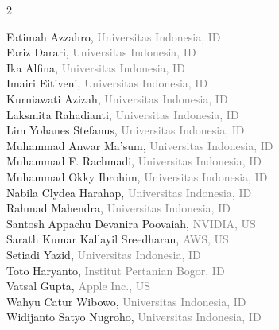 \documentclass[10pt,a4paper]{article}
\begin{document}
\begin{multicols}{2}
\begin{minipage}{\linewidth}
Fatimah Azzahro, \textcolor{gray}{Universitas Indonesia, ID}\\
Fariz Darari, \textcolor{gray}{Universitas Indonesia, ID}\\
Ika Alfina, \textcolor{gray}{Universitas Indonesia, ID}\\
Imairi Eitiveni, \textcolor{gray}{Universitas Indonesia, ID}\\
Kurniawati Azizah, \textcolor{gray}{Universitas Indonesia, ID}\\
Laksmita Rahadianti, \textcolor{gray}{Universitas Indonesia, ID}\\
Lim Yohanes Stefanus, \textcolor{gray}{Universitas Indonesia, ID}\\
Muhammad Anwar Ma'sum, \textcolor{gray}{Universitas Indonesia, ID}\\
Muhammad F. Rachmadi, \textcolor{gray}{Universitas Indonesia, ID}\\
Muhammad Okky Ibrohim, \textcolor{gray}{Universitas Indonesia, ID}\\
Nabila Clydea Harahap, \textcolor{gray}{Universitas Indonesia, ID}\\
Rahmad Mahendra, \textcolor{gray}{Universitas Indonesia, ID}\\
Santosh Appachu Devanira Poovaiah, \textcolor{gray}{NVIDIA, US}\\
Sarath Kumar Kallayil Sreedharan, \textcolor{gray}{AWS, US}\\
Setiadi Yazid, \textcolor{gray}{Universitas Indonesia, ID}\\
Toto Haryanto, \textcolor{gray}{Institut Pertanian Bogor, ID}\\
Vatsal Gupta, \textcolor{gray}{Apple Inc., US}\\
Wahyu Catur Wibowo, \textcolor{gray}{Universitas Indonesia, ID}\\
Widijanto Satyo Nugroho, \textcolor{gray}{Universitas Indonesia, ID}\\
\end{minipage}
\vspace{0.8em}
\end{multicols}

\clearpage
\end{document}
